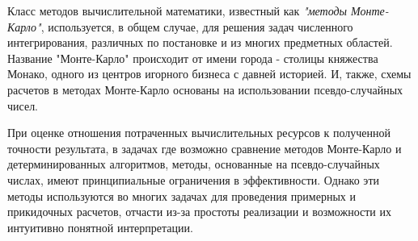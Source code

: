 

Класс методов вычислительной математики, известный как \textit{"методы Монте-Карло"}, используется, в общем случае, для решения задач численного интегрирования, различных по постановке и из многих предметных областей. Название "Монте-Карло" происходит от имени города -  столицы княжества Монако, одного из центров игорного бизнеса с давней историей. И, также, схемы расчетов в методах Монте-Карло основаны на использовании псевдо-случайных чисел. 

При оценке отношения потраченных вычислительных ресурсов к полученной точности результата, в задачах где возможно сравнение методов Монте-Карло и детерминированных алгоритмов, методы, основанные на псевдо-случайных числах, имеют принципиальные ограничения в эффективности. Однако эти методы используются во многих задачах для проведения примерных и прикидочных расчетов, отчасти из-за простоты реализации и возможности их интуитивно понятной интерпретации.

